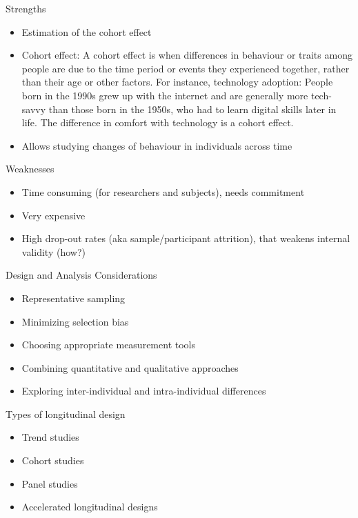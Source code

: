 \documentclass[
  ignorenonframetext,
  aspectratio=169,
]{beamer}
\providecommand{\tightlist}{%
  \setlength{\itemsep}{0pt}\setlength{\parskip}{0pt}}\usepackage{longtable,booktabs,array}
\begin{document}
\begin{frame}{Strengths}
\label{strengths}
\begin{itemize}[<+->]
\tightlist
\item
  Estimation of the cohort effect
\item
  Cohort effect: A cohort effect is when differences in behaviour or
  traits among people are due to the time period or events they
  experienced together, rather than their age or other factors. For
  instance, technology adoption: People born in the 1990s grew up with
  the internet and are generally more tech-savvy than those born in the
  1950s, who had to learn digital skills later in life. The difference
  in comfort with technology is a cohort effect.
\item
  Allows studying changes of behaviour in individuals across time
\end{itemize}
\end{frame}

\begin{frame}{Weaknesses}
\label{weaknesses}
\begin{itemize}[<+->]
\tightlist
\item
  Time consuming (for researchers and subjects), needs commitment
\item
  Very expensive
\item
  High drop-out rates (aka sample/participant attrition), that weakens
  internal validity (how?)
\end{itemize}
\end{frame}

\begin{frame}{Design and Analysis Considerations}
\label{design-and-analysis-considerations}
\begin{itemize}[<+->]
\tightlist
\item
  Representative sampling
\item
  Minimizing selection bias
\item
  Choosing appropriate measurement tools
\item
  Combining quantitative and qualitative approaches
\item
  Exploring inter-individual and intra-individual differences
\end{itemize}
\end{frame}

\begin{frame}{Types of longitudinal design}
\label{types-of-longitudinal-design}
\begin{itemize}
\tightlist
\item
  Trend studies
\item
  Cohort studies
\item
  Panel studies
\item
  Accelerated longitudinal designs
\end{itemize}
\end{frame}
\end{document}
